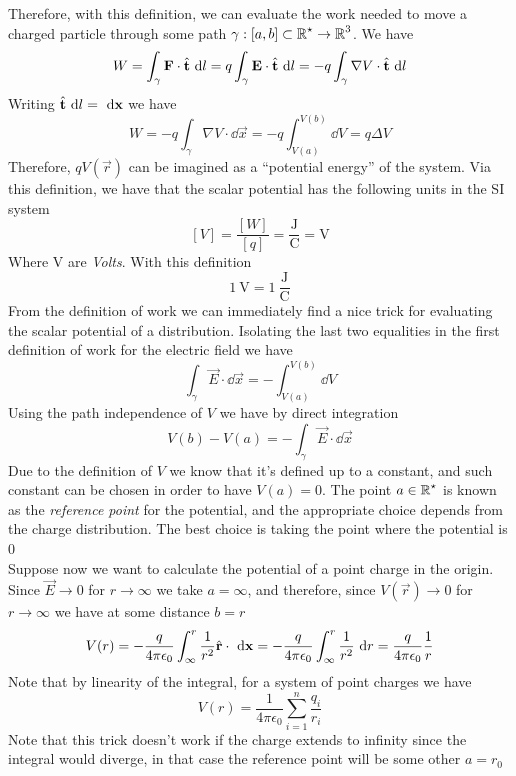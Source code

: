 \documentclass[../electromagnetism]{subfiles}
\begin{document}
Therefore, with this definition, we can evaluate the work needed to move a charged particle through some path $\gamma:[a,b]\subset\operatorname{\mathbb{R}}^\star\to\operatorname{\mathbb{R}}^3$. We have
\begin{equation*}
	W=\int_{\gamma}^{}\mathbf{F}\cdot\hat{\mathbf{t}}\ \mathrm{d} l=q\int_\gamma\mathbf{E}\cdot\hat{\mathbf{t}}\ \mathrm{d} l=-q\int_\gamma\nabla V\cdot\hat{\mathbf{t}}\ \mathrm{d} l
\end{equation*}
Writing $\hat{\mathbf{t}}\ \mathrm{d} l=\ \mathrm{d}\mathbf{x}$ we have
\begin{equation}
	W=-q\int_{\gamma}\nabla V\cdot\dd\vec{x}=-q\int_{V(a)}^{V(b)}\dd V=q\Delta V
	\label{eq:visvivaes}
\end{equation}
Therefore, $qV(\vec{r})$ can be imagined as a ``potential energy'' of the system. Via this definition, we have that the scalar potential has the following units in the SI system
\begin{equation}
	\left[ V \right]=\frac{\left[ W \right]}{\left[ q \right]}=\mathrm{\frac{J}{C}}=\mathrm{V}
	\label{eq:voltsdef}
\end{equation}
Where $\mathrm{V}$ are \textit{Volts}. With this definition
\begin{equation}
	1\ \mathrm{V}=1\ \mathrm{\frac{J}{C}}
	\label{eq:voltdef}
\end{equation}
From the definition of work we can immediately find a nice trick for evaluating the scalar potential of a distribution. Isolating the last two equalities in the first definition of work for the electric field we have
\begin{equation}
	\int_{\gamma}^{}\vec{E}\cdot\dd\vec{x}=-\int_{V(a)}^{V(b)}\dd V
	\label{eq:Vpathindep}
\end{equation}
Using the path independence of $V$ we have by direct integration
\begin{equation}
	V(b)-V(a)=-\int_{\gamma}^{}\vec{E}\cdot\dd\vec{x}
	\label{eq:trickV}
\end{equation}
Due to the definition of $V$ we know that it's defined up to a constant, and such constant can be chosen in order to have $V(a)=0$. The point $a\in\operatorname{\mathbb{R}}^\star$ is known as the \textit{reference point} for the potential, and the appropriate choice depends from the charge distribution. The best choice is taking the point where the potential is 0\\
Suppose now we want to calculate the potential of a point charge in the origin. Since $\vec{E}\to0$ for $r\to\infty$ we take $a=\infty$, and therefore, since $V(\vec{r})\to0$ for $r\to\infty$ we have at some distance $b=r$
\begin{equation}
	V(r)=-\frac{q}{4\pi\epsilon_0}\int_{\infty}^{r}\frac{1}{r^2}\hat{\mathbf{r}}\cdot\ \mathrm{d}\mathbf{x}=-\frac{q}{4\pi\epsilon_0}\int_{\infty}^{r}\frac{1}{r^2}\ \mathrm{d} r=\frac{q}{4\pi\epsilon_0}\frac{1}{r}
	\label{eq:qoriginpot}
\end{equation}
Note that by linearity of the integral, for a system of point charges we have
\begin{equation}
	V(r)=\frac{1}{4\pi\epsilon_0}\sum_{i=1}^n\frac{q_i}{r_i}
	\label{eq:systemchargespot}
\end{equation}
Note that this trick doesn't work if the charge extends to infinity since the integral would diverge, in that case the reference point will be some other $a=r_0$
\end{document}
